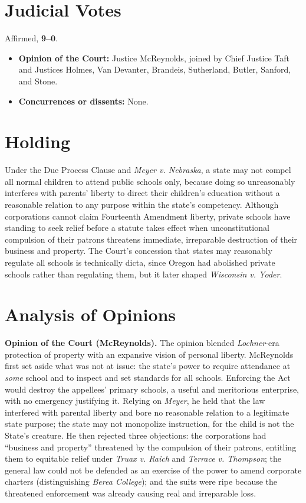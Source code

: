 \documentclass[12pt]{article}
\begin{document}
\section{Judicial Votes}

Affirmed, \textbf{9--0}.
\begin{itemize}
\item \textbf{Opinion of the Court:} Justice McReynolds, joined by Chief Justice Taft and Justices Holmes, Van Devanter, Brandeis, Sutherland, Butler, Sanford, and Stone.
\item \textbf{Concurrences or dissents:} None.
\end{itemize}

\section{Holding}

Under the Due Process Clause and \textit{Meyer v. Nebraska}, a state may not compel all normal children to attend public schools only, because doing so unreasonably interferes with parents' liberty to direct their children's education without a reasonable relation to any purpose within the state's competency. Although corporations cannot claim Fourteenth Amendment liberty, private schools have standing to seek relief before a statute takes effect when unconstitutional compulsion of their patrons threatens immediate, irreparable destruction of their business and property. The Court's concession that states may reasonably regulate all schools is technically dicta, since Oregon had abolished private schools rather than regulating them, but it later shaped \textit{Wisconsin v. Yoder}.

\section{Analysis of Opinions}

\textbf{Opinion of the Court (McReynolds).} The opinion blended \textit{Lochner}-era protection of property with an expansive vision of personal liberty. McReynolds first set aside what was not at issue: the state's power to require attendance at \emph{some} school and to inspect and set standards for all schools. Enforcing the Act would destroy the appellees' primary schools, a useful and meritorious enterprise, with no emergency justifying it. Relying on \textit{Meyer}, he held that the law interfered with parental liberty and bore no reasonable relation to a legitimate state purpose; the state may not monopolize instruction, for the child is not the State's creature. He then rejected three objections: the corporations had ``business and property'' threatened by the compulsion of their patrons, entitling them to equitable relief under \textit{Truax v. Raich} and \textit{Terrace v. Thompson}; the general law could not be defended as an exercise of the power to amend corporate charters (distinguishing \textit{Berea College}); and the suits were ripe because the threatened enforcement was already causing real and irreparable loss.
\end{document}
